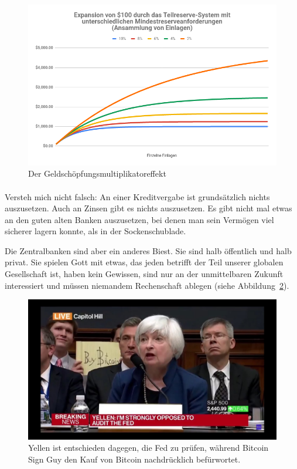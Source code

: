 \begin{figure}
  \centering
  \includegraphics{assets/images/money-multiplier-de.png}
  \caption{Der Geldschöpfungsmultiplikatoreffekt}
  \label{fig:money-multiplier}
\end{figure}

\paragraph{}
Versteh mich nicht falsch: An einer Kreditvergabe ist grundsätzlich nichts
auszusetzen. Auch an Zinsen gibt es nichts auszusetzen. Es gibt nicht mal etwas
an den guten alten Banken auszusetzen, bei denen man sein Vermögen viel sicherer
lagern konnte, als in der Sockenschublade.

Die Zentralbanken sind aber ein anderes Biest. Sie sind halb öffentlich und halb
privat. Sie spielen Gott mit etwas, das jeden betrifft der Teil unserer globalen
Gesellschaft ist, haben kein Gewissen, sind nur an der unmittelbaren Zukunft
interessiert und müssen niemandem Rechenschaft ablegen (siehe
Abbildung~\ref{fig:bsg}).

\begin{figure}
  \centering
  \includegraphics{assets/images/bsg.jpg}
  \caption{Yellen ist entschieden dagegen, die Fed zu prüfen, während Bitcoin
  Sign Guy den Kauf von Bitcoin nachdrücklich befürwortet.}
  \label{fig:bsg}
\end{figure}

